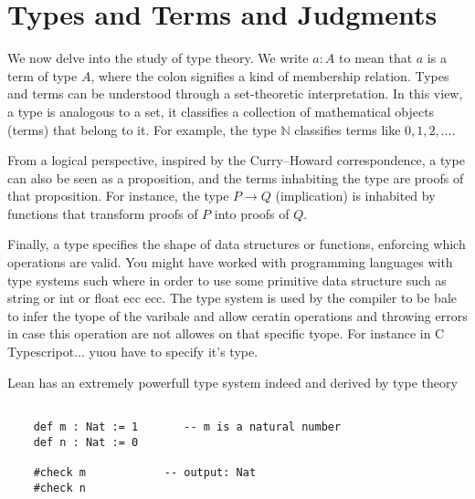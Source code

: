 \section{Types and Terms and Judgments}
We now delve into the study of type theory. We write $a : A$ to mean that $a$ is a term of type $A$, where the 
colon signifies a kind of membership relation.
Types and terms can be understood through a set-theoretic interpretation. In this view, a type is analogous to 
a set, it classifies a collection of mathematical objects (terms) that belong to it. For example, the 
type $\mathbb{N}$ classifies terms like $0, 1, 2, \ldots$.

From a logical perspective, inspired by the Curry–Howard correspondence, a type can also be seen as a proposition, 
and the terms inhabiting the type are proofs of that proposition. For instance, the type $P \to Q$ (implication) 
is inhabited by functions that transform proofs of $P$ into proofs of $Q$.

Finally, a type specifies the shape of data structures or functions, enforcing which operations are valid. 
You might have worked with programming languages with type systems such where in order to use some 
primitive data structure such as string or int or float ecc ecc.
The type system is used by the compiler to be bale to infer the tyope of the varibale and allow ceratin operations 
and throwing errors in case this operation are not allowes on that specific tyope.
For instance in C Typescripot...
yuou have to specify it's type.


Lean has an extremely powerfull type system indeed and derived by type theory
\begin{example}
    \begin{lstlisting}[language=Lean]
    
    def m : Nat := 1       -- m is a natural number
    def n : Nat := 0
    
    #check m            -- output: Nat
    #check n
    
    \end{lstlisting}
\end{example}

